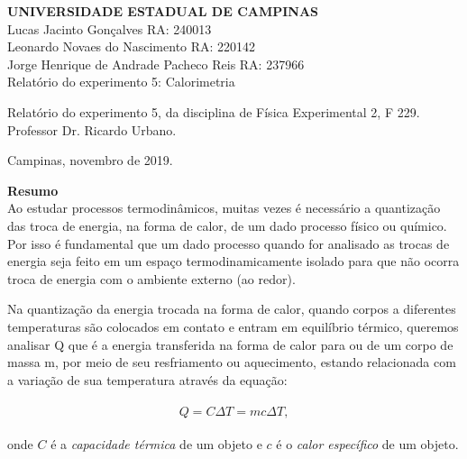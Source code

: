\documentclass[a4paper, 12pt]{article}
\begin{document}

\thispagestyle{empty}
\begin{titlepage}
 \vfill
  \begin{center}
   {\large \textbf{UNIVERSIDADE ESTADUAL DE CAMPINAS}} \\[3cm] %

   {\large Lucas Jacinto Gonçalves RA: 240013 }\\[0.25cm] %
   {\large Leonardo Novaes do Nascimento RA: 220142 }\\[0.25cm]
   {\large Jorge Henrique de Andrade Pacheco Reis RA: 237966 }\\[5.5cm]


   {\Large Relatório do experimento 5: Calorimetria}\\[6cm] %

   \hspace{.45\textwidth} %
   \begin{minipage}{.5\textwidth}
   \large Relatório do experimento 5, da disciplina de Física Experimental 2, F 229.\\[1cm]
Professor Dr. Ricardo Urbano.		%
  \end{minipage}
  \vfill

\vspace{2cm}

\large Campinas, novembro de 2019. 	%


\end{center}

\end{titlepage}



\pagebreak




\textbf{Resumo}
\\

Ao estudar processos termodinâmicos, muitas vezes é necessário a quantização das troca de energia, na forma de calor, de um dado processo físico ou químico. Por isso é fundamental que um dado processo quando for analisado as trocas de energia seja feito em um espaço termodinamicamente isolado para que não ocorra troca de energia com o ambiente externo (ao redor).

Na quantização da energia trocada na forma de calor, quando corpos a diferentes temperaturas são colocados em contato e entram em equilíbrio térmico, queremos analisar Q que é a energia transferida na forma de calor para ou de um corpo de massa m, por meio de seu resfriamento ou aquecimento, estando relacionada com a variação de sua temperatura através da equação: 
\\
\\
$$Q = C \Delta T = mc \Delta T, $$
\\
onde $C$ é a \textit{capacidade térmica} de um objeto e $c$ é o \textit{calor específico} de um objeto.
\end{document}
